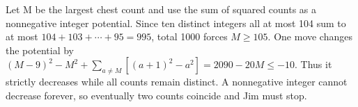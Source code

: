 Let M be the largest chest count and use the sum of squared counts as a nonnegative integer potential. Since ten distinct integers all at most 104 sum to at most $104+103+\cdots+95=995$, total 1000 forces $M\ge105$. One move changes the potential by $(M-9)^2-M^2+\sum_{a\ne M}[(a+1)^2-a^2]=2090-20M\le-10$. Thus it strictly decreases while all counts remain distinct. A nonnegative integer cannot decrease forever, so eventually two counts coincide and Jim must stop.
